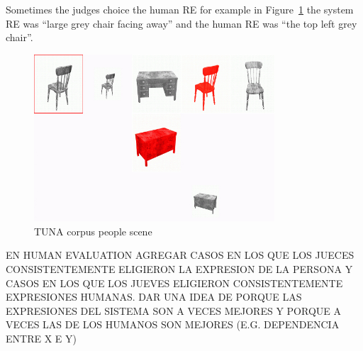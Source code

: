 Sometimes the judges choice the human RE for example in Figure~\ref{largeGreyChair} the
system RE was ``large grey chair facing away'' and the human RE was ``the top left grey chair''.

\begin{figure}[ht]
\centering
\includegraphics[width=0.8\textwidth]{images/largeGreyChair.jpg}
\caption{TUNA corpus people scene}
\label{largeGreyChair}
\end{figure}


EN HUMAN EVALUATION AGREGAR CASOS EN LOS QUE LOS JUECES CONSISTENTEMENTE ELIGIERON LA EXPRESION DE LA PERSONA Y CASOS EN LOS QUE LOS JUEVES ELIGIERON CONSISTENTEMENTE EXPRESIONES HUMANAS. DAR UNA IDEA DE PORQUE LAS EXPRESIONES DEL SISTEMA SON A VECES MEJORES Y PORQUE A VECES LAS DE LOS HUMANOS SON MEJORES (E.G. DEPENDENCIA ENTRE X E Y)
